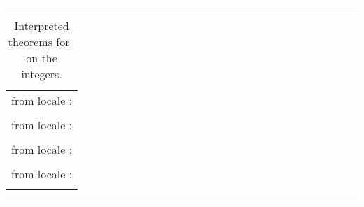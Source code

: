 \begin{isabellebody}
\begin{isamarkuptext}
\begin{table}
\hrule
\vspace{2ex}
\begin{center}
\begin{tabular}{l}
  \isa{int{\isaliteral{2E}{\isachardot}}less{\isaliteral{5F}{\isacharunderscore}}def} from locale \isa{partial{\isaliteral{5F}{\isacharunderscore}}order}: \\
  \quad \isa{{\isaliteral{28}{\isacharparenleft}}{\isaliteral{3F}{\isacharquery}}x\ {\isaliteral{3C}{\isacharless}}\ {\isaliteral{3F}{\isacharquery}}y{\isaliteral{29}{\isacharparenright}}\ {\isaliteral{3D}{\isacharequal}}\ {\isaliteral{28}{\isacharparenleft}}{\isaliteral{3F}{\isacharquery}}x\ {\isaliteral{5C3C6C653E}{\isasymle}}\ {\isaliteral{3F}{\isacharquery}}y\ {\isaliteral{5C3C616E643E}{\isasymand}}\ {\isaliteral{3F}{\isacharquery}}x\ {\isaliteral{5C3C6E6F7465713E}{\isasymnoteq}}\ {\isaliteral{3F}{\isacharquery}}y{\isaliteral{29}{\isacharparenright}}} \\
  \isa{int{\isaliteral{2E}{\isachardot}}meet{\isaliteral{5F}{\isacharunderscore}}left} from locale \isa{lattice}: \\
  \quad \isa{min\ {\isaliteral{3F}{\isacharquery}}x\ {\isaliteral{3F}{\isacharquery}}y\ {\isaliteral{5C3C6C653E}{\isasymle}}\ {\isaliteral{3F}{\isacharquery}}x} \\
  \isa{int{\isaliteral{2E}{\isachardot}}join{\isaliteral{5F}{\isacharunderscore}}distr} from locale \isa{distrib{\isaliteral{5F}{\isacharunderscore}}lattice}: \\
  \quad \isa{max\ {\isaliteral{3F}{\isacharquery}}x\ {\isaliteral{28}{\isacharparenleft}}min\ {\isaliteral{3F}{\isacharquery}}y\ {\isaliteral{3F}{\isacharquery}}z{\isaliteral{29}{\isacharparenright}}\ {\isaliteral{3D}{\isacharequal}}\ min\ {\isaliteral{28}{\isacharparenleft}}max\ {\isaliteral{3F}{\isacharquery}}x\ {\isaliteral{3F}{\isacharquery}}y{\isaliteral{29}{\isacharparenright}}\ {\isaliteral{28}{\isacharparenleft}}max\ {\isaliteral{3F}{\isacharquery}}x\ {\isaliteral{3F}{\isacharquery}}z{\isaliteral{29}{\isacharparenright}}} \\
  \isa{int{\isaliteral{2E}{\isachardot}}less{\isaliteral{5F}{\isacharunderscore}}total} from locale \isa{total{\isaliteral{5F}{\isacharunderscore}}order}: \\
  \quad \isa{{\isaliteral{3F}{\isacharquery}}x\ {\isaliteral{3C}{\isacharless}}\ {\isaliteral{3F}{\isacharquery}}y\ {\isaliteral{5C3C6F723E}{\isasymor}}\ {\isaliteral{3F}{\isacharquery}}x\ {\isaliteral{3D}{\isacharequal}}\ {\isaliteral{3F}{\isacharquery}}y\ {\isaliteral{5C3C6F723E}{\isasymor}}\ {\isaliteral{3F}{\isacharquery}}y\ {\isaliteral{3C}{\isacharless}}\ {\isaliteral{3F}{\isacharquery}}x}
\end{tabular}
\end{center}
\hrule
\caption{Interpreted theorems for~ on the integers.}
\label{tab:int-lattice}
\end{table}


\end{isamarkuptext}
\end{isabellebody}
